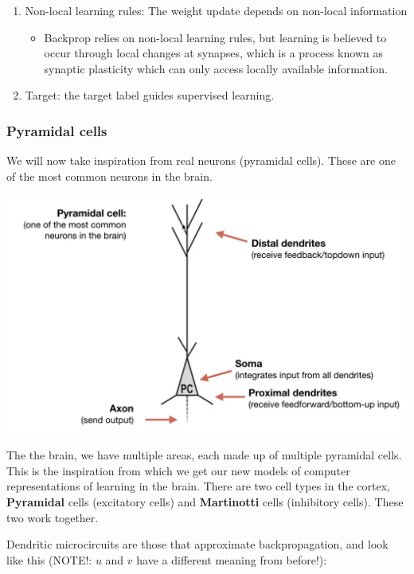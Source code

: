 \documentclass[11pt,a4paper,titlepage,dvipsnames,cmyk]{scrartcl}
\begin{document}
\begin{enumerate}
\begin{itemize}
\end{itemize}
\item Non-local learning rules: The weight update depends on non-local information
\begin{itemize}
    \item Backprop relies on non-local learning rules, but learning is believed to occur through local changes at synapses, which is a process known as synaptic plasticity which can only access locally available information.
\end{itemize}
\item Target: the target label guides supervised learning.
\end{enumerate}

\subsubsection{Pyramidal cells}
We will now take inspiration from real neurons (pyramidal cells). These are one of the most common neurons in the brain.

\begin{center}
\includegraphics[scale=.3]{pics/pyramidal-cell.png}
\end{center}

The the brain, we have multiple areas, each made up of multiple pyramidal cells. This is the inspiration from which we get our new models of computer representations of learning in the brain. There are two cell types in the cortex, \textbf{Pyramidal} cells (excitatory cells) and \textbf{Martinotti} cells (inhibitory cells). These two work together. 

Dendritic microcircuits are those that approximate backpropagation, and look like this (NOTE!: $u$ and $v$ have a different meaning from before!):
\end{document}
